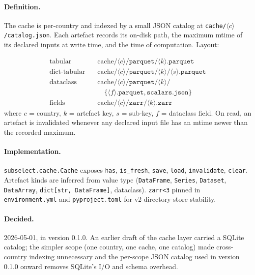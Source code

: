 \documentclass[11pt,a4paper]{article}
\begin{document}
\begin{sloppypar}\paragraph{Definition.} The cache is per-country and indexed by a small
JSON catalog at \texttt{cache/}$\langle c \rangle$\texttt{/catalog.json}.
Each artefact records its on-disk path, the maximum mtime of its declared
inputs at write time, and the time of computation. Layout:\end{sloppypar}
%
{\small\begin{align*}
  \text{tabular}     \quad &\text{cache/}\langle c \rangle / \texttt{parquet/} \langle k \rangle \texttt{.parquet} \\
  \text{dict-tabular} \quad &\text{cache/}\langle c \rangle / \texttt{parquet/} \langle k \rangle / \langle s \rangle \texttt{.parquet} \\
  \text{dataclass}   \quad &\text{cache/}\langle c \rangle / \texttt{parquet/} \langle k \rangle / \\
                            &\quad \{\langle f \rangle \texttt{.parquet}, \texttt{scalars.json}\} \\
  \text{fields}      \quad &\text{cache/}\langle c \rangle / \texttt{zarr/} \langle k \rangle \texttt{.zarr}
\end{align*}}
%
where $c$ = country, $k$ = artefact key, $s$ = sub-key, $f$ = dataclass
field. On read, an artefact is invalidated whenever any declared input
file has an mtime newer than the recorded maximum.

\paragraph{Implementation.} \texttt{subselect.cache.Cache} exposes
\texttt{has}, \texttt{is\_fresh}, \texttt{save}, \texttt{load},
\texttt{invalidate}, \texttt{clear}. Artefact kinds are inferred from
value type (\texttt{DataFrame}, \texttt{Series}, \texttt{Dataset},
\texttt{DataArray}, \texttt{dict[str, DataFrame]}, dataclass).
\texttt{zarr<3} pinned in \texttt{environment.yml} and
\texttt{pyproject.toml} for v2 directory-store stability.

\paragraph{Decided.} 2026-05-01, in version 0.1.0. An earlier draft of
the cache layer carried a SQLite catalog; the simpler scope (one
country, one cache, one catalog) made cross-country indexing unnecessary
and the per-scope JSON catalog used in version 0.1.0 onward removes
SQLite's I/O and schema overhead.
\end{document}
